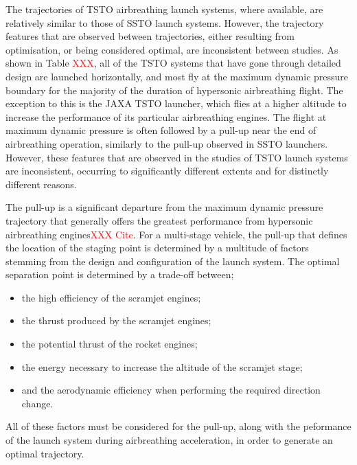 The trajectories of TSTO airbreathing launch systems, where available, are relatively similar to those of SSTO launch systems. However, the trajectory features that are observed between trajectories, either resulting from optimisation, or being considered optimal, are inconsistent between studies. As shown in Table \textcolor{red}{XXX}, all of the TSTO systems that have gone through detailed design are launched horizontally, and most fly at the maximum dynamic pressure boundary for the majority of the duration of hypersonic airbreathing flight. The exception to this is the JAXA TSTO launcher, which flies at a higher altitude to increase the performance of its particular airbreathing engines. The flight at maximum dynamic pressure is often followed by a pull-up near the end of airbreathing operation, similarly to the pull-up observed in SSTO launchers. 
However, these features that are observed in the studies of TSTO launch systems are inconsistent, occurring to significantly different extents and for distinctly different reasons. 

The pull-up is a significant departure from the maximum dynamic pressure trajectory that generally offers the greatest performance from hypersonic airbreathing engines\textcolor{red}{XXX Cite}.
For a multi-stage vehicle, the pull-up that defines the location of the staging point is determined by a multitude of factors stemming from the design and configuration of the launch system. The optimal separation point is determined by a trade-off between;
\begin{itemize}
	\item the high efficiency of the scramjet engines;
	\item the thrust produced by the scramjet engines;
	\item the potential thrust of the rocket engines;
	\item the energy necessary to increase the altitude of the scramjet stage;
	\item and the aerodynamic efficiency when performing the required direction change.
\end{itemize}
All of these factors must be considered for the pull-up, along with the peformance of the launch system during airbreathing acceleration, in order to generate an optimal trajectory. 

